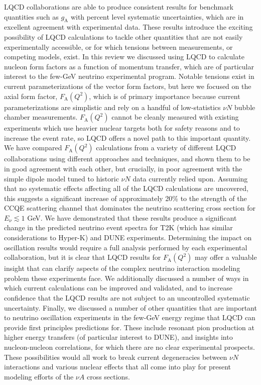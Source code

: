 \documentclass{ar-1col}
\begin{document}
LQCD collaborations are able to produce consistent results for benchmark quantities such as $g_{\mathrm{A}}$ with percent level systematic uncertainties, which are in excellent agreement with experimental data.
These results introduce the exciting possibility of LQCD calculations to tackle other quantities that are not easily experimentally accessible, or for which tensions between measurements, or competing models, exist.
In this review we discussed using LQCD to calculate nucleon form factors as a function of momentum transfer, which are of particular interest to the few-GeV neutrino experimental program.
Notable tensions exist in current parameterizations of the vector form factors, but here we focused on the axial form factor, $F_{\mathrm{A}}(Q^2)$, which is of primary importance because current parameterizations are simplistic and rely on a handful of low-statistics $\nu N$ bubble chamber measurements.
$F_{\mathrm{A}}(Q^2)$ cannot be cleanly measured with existing experiments which use heavier nuclear targets both for safety reasons and to increase the event rate, so LQCD offers a novel path to this important quantity.
We have compared $F_{\mathrm{A}}(Q^2)$ calculations from a variety of different LQCD collaborations using different approaches and techniques, and shown them to be in good agreement with each other, but crucially, in poor agreement with the simple dipole model tuned to historic $\nu N$ data currently relied upon.
Assuming that no systematic effects affecting all of the LQCD calculations are uncovered, this suggests a significant increase of approximately 20\% to the strength of the CCQE scattering channel that dominates the neutrino scattering cross section for $E_{\nu} \lesssim 1$ GeV.
We have demonstrated that these results produce a significant change in the predicted neutrino event spectra for T2K (which has similar considerations to Hyper-K) and DUNE experiments.
Determining the impact on oscillation results would require a full analysis performed by each experimental collaboration, but it is clear that LQCD results for $F_{\mathrm{A}}(Q^2)$ may offer a valuable insight that can clarify aspects of the complex neutrino interaction modeling problem these experiments face.
We additionally discussed a number of ways in which current calculations can be improved and validated, and to increase confidence that the LQCD results are not subject to an uncontrolled systematic uncertainty.
Finally, we discussed a number of other quantities that are important to neutrino oscillation experiments in the few-GeV energy regime that LQCD can provide first principles predictions for.
These include resonant pion production at higher energy transfers (of particular interest to DUNE), and insights into nucleon-nucleon correlations, for which there are no clear experimental prospects.
These possibilities would all work to break current degeneracies between $\nu N$ interactions and various nuclear effects that all come into play for present modeling efforts of the $\nu A$ cross sections.
\end{document}
